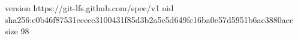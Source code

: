 version https://git-lfs.github.com/spec/v1
oid sha256:e0b46f87531eceec3100431f85d3b2a5c5d649fe16ba0e57d5951b6ac3880aec
size 98
